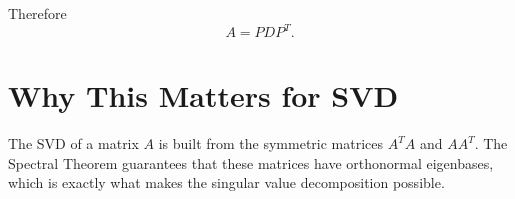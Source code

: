 Therefore
\[
\boxed{
A=PDP^T.
}
\]

\section{Why This Matters for SVD}

The SVD of a matrix $A$ is built from the symmetric matrices $A^TA$ and $AA^T$. The Spectral Theorem guarantees that these matrices have orthonormal eigenbases, which is exactly what makes the singular value decomposition possible.
